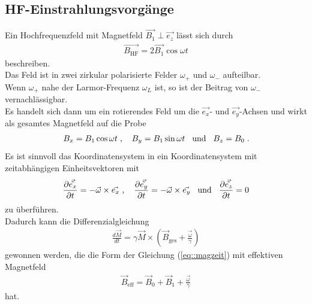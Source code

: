 \documentclass[]{scrartcl}
\begin{document}
\subsection{HF-Einstrahlungsvorgänge}
Ein Hochfrequenzfeld mit Magnetfeld $\vec{B_1} \perp \vec{e_z}$ lässt sich durch
\begin{align}
\vec{B_{\text{HF}}}=2\vec{B_1} \cos \omega t
\end{align}
beschreiben.\\
Das Feld ist in zwei zirkular polarisierte Felder $\omega_+$ und $\omega_-$ aufteilbar.\\
Wenn $\omega_+$ nahe der Larmor-Frequenz $\omega_L$ ist, so ist der Beitrag von $\omega_-$ vernachlässigbar.\\
Es handelt sich dann um ein rotierendes Feld um die $\vec{e_x}$- und $\vec{e_y}$-Achsen und wirkt als gesamtes Magnetfeld auf die Probe
\begin{align*}
B_x=B_1 \cos \omega t \hspace*{0.1cm}\text{,}\hspace*{0.4cm} B_y=B_1 \sin \omega t \hspace*{0.3cm}\text{und}\hspace*{0.3cm} B_z=B_0\hspace*{0.1cm}\text{.}
\end{align*}
Es ist sinnvoll das Koordinatensystem in ein Koordinatensystem mit zeitabhängigen Einheitsvektoren mit
\begin{align}
\frac{\partial \vec{\tilde{e_x}}}{\partial t}= -\vec{\omega} \times \vec{e_x}\hspace*{0.1cm}\text{,}\hspace*{0.4cm}
\frac{\partial \vec{\tilde{e_y}}}{\partial t}= -\vec{\omega} \times \vec{e_y}\hspace*{0.3cm}\text{und}\hspace*{0.3cm}
\frac{\partial \vec{\tilde{e_z}}}{\partial t}= 0
\end{align}
zu überführen.\\
Dadurch kann die Differenzialgleichung 
\begin{align}
\frac{d \vec{M}}{d t}= \gamma \vec{M}\times \left(\vec{B}_{\text{ges}}+\frac{\vec{\omega}}{\gamma}\right)
\end{align}
gewonnen werden, die die Form der Gleichung (\ref{eq::magzeit}) mit effektiven Magnetfeld
\begin{align}
\vec{B}_\text{eff}=\vec{B}_0+\vec{B}_1+\frac{\vec{\omega}}{\gamma}
\end{align}
hat.\\
\end{document}
